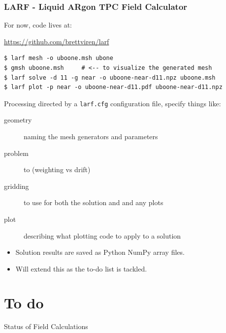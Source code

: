 \documentclass[xcolor=dvipsnames]{beamer}
\begin{document}
\begin{frame}[fragile]
  \frametitle{LARF - Liquid ARgon TPC Field Calculator}

  \footnotesize

  For now, code lives at:
  \begin{center}
    \url{https://github.com/brettviren/larf}
  \end{center}

\begin{verbatim}
$ larf mesh -o uboone.msh ubone
$ gmsh uboone.msh     # <-- to visualize the generated mesh
$ larf solve -d 11 -g near -o uboone-near-d11.npz uboone.msh
$ larf plot -p near -o uboone-near-d11.pdf uboone-near-d11.npz
\end{verbatim}

  Processing directed by a \texttt{larf.cfg} configuration file, specify things like:
  \begin{description}
  \item[geometry] naming the mesh generators and parameters
  \item[problem] to  (weighting vs drift)
  \item[gridding] to use for both the solution and and any plots
  \item[plot] describing what plotting code to apply to a solution
  \end{description}

  \begin{itemize}
  \item Solution results are saved as Python NumPy array files.
  \item Will extend this as the to-do list is tackled.
  \end{itemize}



\end{frame}

\section{To do}

\begin{frame}{Status of Field Calculations}
  \tableofcontents[currentsection]
\end{frame}
\end{document}

